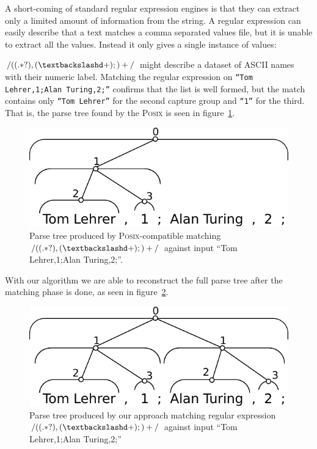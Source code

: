 \documentclass[11pt,a4paper,twoside,openright]{Thesis}
\theoremstyle{definition}
\newcommand{\regex}[1]{\ensuremath{\mathtt{/#1/}}}
\newcommand{\Figref}[1]{figure~\ref{fig:#1}}
\newcommand{\figlabel}[1]{\label{fig:#1}}
\begin{document}
A short-coming of standard regular expression engines is that they can
extract only a limited amount of information from the string. A regular
expression can easily describe that a text matches a comma separated values
file, but it is unable to extract all the values.  Instead it only gives a
single instance of values:

\regex{((.*?),(\textbackslash d+);)+} might describe a dataset of ASCII names
with their numeric label. Matching the regular expression on \texttt{``Tom
Lehrer,1;Alan Turing,2;''} confirms that the list is well formed, but the
match contains only \texttt{``Tom Lehrer''} for the second capture group
and \texttt{``1''} for the third. That is, the parse tree found by the
\textsc{Posix} is seen in \Figref{posix}.

\begin{figure}[htp]
\centering
\includegraphics[width=.75\linewidth]{graphs/posix_parse}
\caption[Posix parse tree]{\figlabel{lehrer-posix} Parse tree produced by
\textsc{Posix}-compatible matching \regex{((.*?),(\textbackslash d+);)+}
against input ``Tom Lehrer,1;Alan Turing,2;''.}
\figlabel{posix}
\end{figure}

With our algorithm we are able to reconstruct the full parse
tree after the matching phase is done, as seen in \Figref{our-tree}.

\begin{figure}[htp]
\centering
\includegraphics[width=.75\linewidth]{graphs/full_parse}
\caption[Full parse tree]{\figlabel{lehrer-tree} Parse tree produced by our approach matching
regular expression \regex{((.*?),(\textbackslash d+);)+} against input ``Tom
Lehrer,1;Alan Turing,2;''}
\figlabel{our-tree}
\end{figure}
\end{document}
